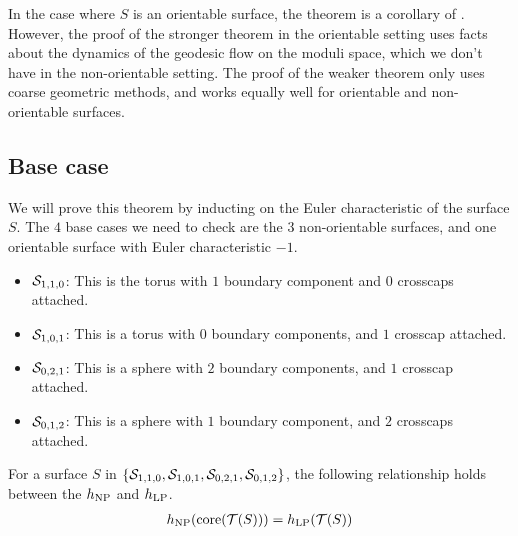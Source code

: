 \documentclass[12pt, reqno]{amsart}
\begin{document}
\begin{rem}
  In the case where $S$ is an orientable surface, the theorem is a corollary of \textcite[Theorem 1.2]{10.1215/00127094-1548443}.
  However, the proof of the stronger theorem in the orientable setting uses facts about the dynamics of the geodesic flow on the moduli space, which we don't have in the non-orientable setting.
  The proof of the weaker theorem only uses coarse geometric methods, and works equally well for orientable and non-orientable surfaces.
\end{rem}

\subsection{Base case}
\label{sec:base-case}

We will prove this theorem by inducting on the Euler characteristic of the surface $S$.
The $4$ base cases we need to check are the $3$ non-orientable surfaces, and one orientable surface with Euler characteristic $-1$.
\begin{itemize}
\item $\mathcal{S}_{1,1,0}$: This is the torus with $1$ boundary component and $0$ crosscaps attached.
\item $\mathcal{S}_{1,0,1}$: This is a torus with $0$ boundary components, and $1$ crosscap attached.
\item $\mathcal{S}_{0,2,1}$: This is a sphere with $2$ boundary components, and $1$ crosscap attached.
\item $\mathcal{S}_{0,1,2}$: This is a sphere with $1$ boundary component, and $2$ crosscaps attached.
\end{itemize}


\begin{lemma}
  \label{lem:entropy-equality-base-case}
  For a surface $S$ in $\left\{ \mathcal{S}_{1,1,0}, \mathcal{S}_{1,0,1}, \mathcal{S}_{0,2,1}, \mathcal{S}_{0,1,2} \right\}$, the following relationship holds between the $h_{\mathrm{NP}}$ and $h_{\mathrm{LP}}$.
  \begin{align*}
    h_{\mathrm{NP}}(\mathrm{core}(\mathcal{T}(S))) = h_{\mathrm{LP}}(\mathcal{T}(S))
  \end{align*}
\end{lemma}
\end{document}
